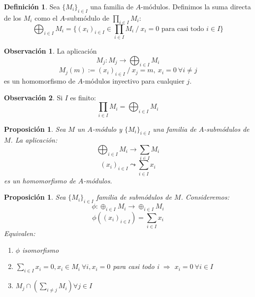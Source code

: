 \documentclass{article}
\theoremstyle{theorem-style}  %
\newtheorem{proposition}[theorem]{Proposición}
\theoremstyle{definition}
\newtheorem{definition}{Definición}[section]
\newtheorem*{observation}{Observación} %
\theoremstyle{example-style}
\begin{document}
\begin{definition}
	Sea $\{M_i\}_{i\in I}$ una familia de $A$-módulos. Definimos la suma directa de los $M_i$ como el $A$-submódulo de $\prod_{i\in I}M_i$:
	\[\bigoplus_{i\in I}M_i=\{(x_i)_{i\in I} \in \prod_{i\in I}M_i \ / \ x_i=0 \text{ para casi todo } i \in I\}\]
\end{definition}

\begin{observation}
	La aplicación
	\[M_j:M_j\longrightarrow\bigoplus_{i\in I}M_i\]
	\[M_j(m):= (x_i)_{i\in I} \ / \ x_j=m,\  x_i=0 \ \forall i\neq j \]
	es un homomorfismo de $A$-módulos inyectivo para cualquier $j$.
\end{observation}

\begin{observation}
	Si $I$ es finito:
	\[\prod_{i\in I}M_i = \bigoplus_{i\in I}M_i \]
\end{observation}

\begin{proposition}
	Sea $M$ un $A$-módulo y $\{M_i\}_{i\in I}$ una familia de $A$-submódulos de $M$. La aplicación:
	\[ \bigoplus_{i\in I}M_i \longrightarrow \sum_{i\in I}M_i \]
	\[ (x_i)_{i\in I} \leadsto \sum_{i\in I}x_i \]
	es un homomorfismo de $A$-módulos.
\end{proposition}

\begin{proposition}
	Sea $ \{M_i\}_{i\in I} $ familia de submódulos de $ M $. Consideremos:
	\[\phi : \oplus_{i\in I} M_i\longrightarrow \oplus_{i\in I }M_i \]
	\[\phi ((x_i)_{i\in I})=\sum_{i\in I} x_i \]
	Equivalen:
	\begin{enumerate}[\hspace{1cm}i)]
		\item $\phi$ isomorfismo
		\item $\sum_{i\in I}x_i=0,x_i \in M_i \ \forall i, x_i=0$ para casi todo i $\Rightarrow$ $ x_i=0 \ \forall i \in I $
		\item $M_j \cap (\sum_{i\neq j}M_i)\forall j \in I$
	\end{enumerate}
\end{proposition}
\end{document}
